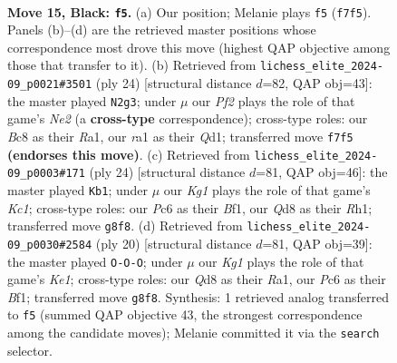 \documentclass[11pt]{article}
\begin{document}
\clearpage

\begin{figure}[p]\centering
\begin{subfigure}{0.46\textwidth}\centering
\resizebox{\linewidth}{!}{%
\newchessgame
\chessboard[
  setfen={rnbq2k1/pp3ppp/2p1r2n/3p4/PP1P1B1b/2N1PP1P/2QKN1P1/R4B1R b - - 0 15},
  showmover=false,
  pgfstyle=straightmove, color=movearrow, markmove={f7-f5}
]}
\caption{}
\end{subfigure}\hfill
\begin{subfigure}{0.46\textwidth}\centering
\resizebox{\linewidth}{!}{%
\newchessgame
\chessboard[
  setfen={rn1qk2r/ppb1npp1/2p1p1b1/6Pp/2PPN2P/5B2/PP2NP2/R1BQK2R w KQkq - 1 13},
  showmover=false,
  pgfstyle=straightmove, color=movearrow, markmove={e2-g3}
]}
\caption{}
\end{subfigure}
\\[4pt]
\begin{subfigure}{0.46\textwidth}\centering
\resizebox{\linewidth}{!}{%
\newchessgame
\chessboard[
  setfen={r3kb1r/2qn1ppp/pn1pb3/1p2p3/4P1P1/1NN1BP2/PPP2Q1P/2KR1B1R w kq - 3 13},
  showmover=false,
  pgfstyle=straightmove, color=movearrow, markmove={c1-b1}
]}
\caption{}
\end{subfigure}\hfill
\begin{subfigure}{0.46\textwidth}\centering
\resizebox{\linewidth}{!}{%
\newchessgame
\chessboard[
  setfen={r2qkb1r/1p1n1pp1/p2pbn2/4p3/4P2p/1NN1B2P/PPPQ1PP1/R3KBR1 w Qkq - 4 11},
  showmover=false,
  pgfstyle=straightmove, color=movearrow, markmove={e1-c1}
]}
\caption{}
\end{subfigure}
\caption{\textbf{Move 15, Black: \texttt{f5}.} (a) Our position; Melanie plays \texttt{f5} (\texttt{f7f5}). Panels (b)--(d) are the retrieved master positions whose correspondence most drove this move (highest QAP objective among those that transfer to it). (b) Retrieved from \texttt{lichess\_elite\_2024-09\_p0021\#3501} (ply 24) [structural distance $d$=82, QAP obj=43]: the master played \texttt{N2g3}; under $\mu$ our \emph{Pf2} plays the role of that game's \emph{Ne2} (a \textbf{cross-type} correspondence); cross-type roles: our \emph{B}c8 as their \emph{R}a1, our \emph{r}a1 as their \emph{Q}d1; transferred move \texttt{f7f5} \textbf{(endorses this move)}. (c) Retrieved from \texttt{lichess\_elite\_2024-09\_p0003\#171} (ply 24) [structural distance $d$=81, QAP obj=46]: the master played \texttt{Kb1}; under $\mu$ our \emph{Kg1} plays the role of that game's \emph{Kc1}; cross-type roles: our \emph{P}c6 as their \emph{B}f1, our \emph{Q}d8 as their \emph{R}h1; transferred move \texttt{g8f8}. (d) Retrieved from \texttt{lichess\_elite\_2024-09\_p0030\#2584} (ply 20) [structural distance $d$=81, QAP obj=39]: the master played \texttt{O-O-O}; under $\mu$ our \emph{Kg1} plays the role of that game's \emph{Ke1}; cross-type roles: our \emph{Q}d8 as their \emph{R}a1, our \emph{P}c6 as their \emph{B}f1; transferred move \texttt{g8f8}. Synthesis: 1 retrieved analog transferred to \texttt{f5} (summed QAP objective 43, the strongest correspondence among the candidate moves); Melanie committed it via the \texttt{search} selector.}
\label{fig:thought-m29}
\end{figure}
\end{document}
